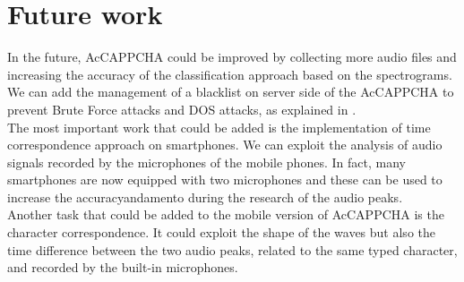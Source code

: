 \chapter{Future work}\label{chapter:Future}
In the future, AcCAPPCHA could be improved by collecting more audio files and increasing the accuracy of the classification approach based on the spectrograms. We can add the management of a blacklist on server side of the AcCAPPCHA to prevent Brute Force attacks and DOS attacks, as explained in .\\
The most important work that could be added is the implementation of time correspondence approach on smartphones. We can exploit the analysis of audio signals recorded by the microphones of the mobile phones. In fact, many smartphones are now equipped with two microphones and these can be used to increase the accuracyandamento during the research of the audio peaks.\\
Another task that could be added to the mobile version of AcCAPPCHA is the character correspondence. It could exploit the shape of the waves but also the time difference between the two audio peaks, related to the same typed character, and  recorded by the built-in microphones\cite{smartphone_acoustic}.  